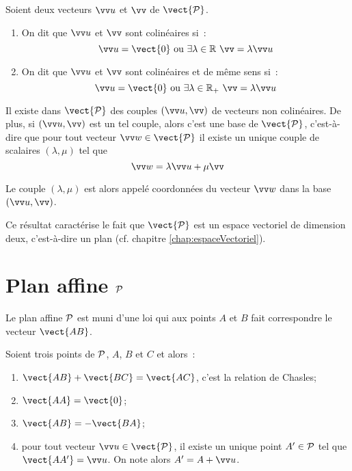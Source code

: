 \begin{defdef}
  Soient deux vecteurs $\vu$ et $\vv$ de $\vect{\P}$.
  \begin{enumerate}
  \item On dit que $\vu$ et $\vv$ sont colinéaires si~:
    \begin{equation}
      \vu = \vect{0} \text{ ou } \exists \lambda \in \R \ \vv=\lambda\vu
    \end{equation}
  \item On dit que $\vu$ et $\vv$ sont colinéaires et de même sens si~:
    \begin{equation}
      \vu = \vect{0} \text{ ou } \exists \lambda \in \R_+ \ \vv=\lambda\vu
    \end{equation}
  \end{enumerate}
\end{defdef}

\begin{prop}
  Il existe dans $\vect{\P}$ des couples $(\vu,\vv)$ de vecteurs non colinéaires. De plus, si $(\vu,\vv)$ est un tel couple, alors c'est une base de $\vect{\P}$, c'est-à-dire que pour tout vecteur $\vw \in \vect{\P}$ il existe un unique couple de scalaires $(\lambda, \mu)$ tel que
  \begin{equation}
    \vw=\lambda \vu + \mu \vv
  \end{equation}
\end{prop}

\begin{defdef}
  Le couple $(\lambda,\mu)$ est alors appelé coordonnées du vecteur $\vw$ dans la base $(\vu,\vv)$.
\end{defdef}

Ce résultat caractérise le fait que $\vect{\P}$ est un espace vectoriel de dimension deux, c'est-à-dire un plan (cf. chapitre \ref{chap:espaceVectoriel}).

\section{Plan affine $\P$}

Le plan affine $\P$ est muni d'une loi qui aux points $A$ et $B$ fait correspondre le vecteur $\vect{AB}$.

\begin{prop}
  Soient trois points de $\P$, $A$, $B$ et $C$ et alors~:
  \begin{enumerate}
  \item $\vect{AB}+\vect{BC}=\vect{AC}$, c'est la relation de Chasles;
  \item $\vect{AA}=\vect{0}$;
  \item $\vect{AB}=-\vect{BA}$;
  \item pour tout vecteur $\vu \in \vect{\P}$, il existe un unique point $A' \in \P$ tel que $\vect{AA'}=\vu$. On note alors $A'=A+\vu$.
  \end{enumerate}
\end{prop}

